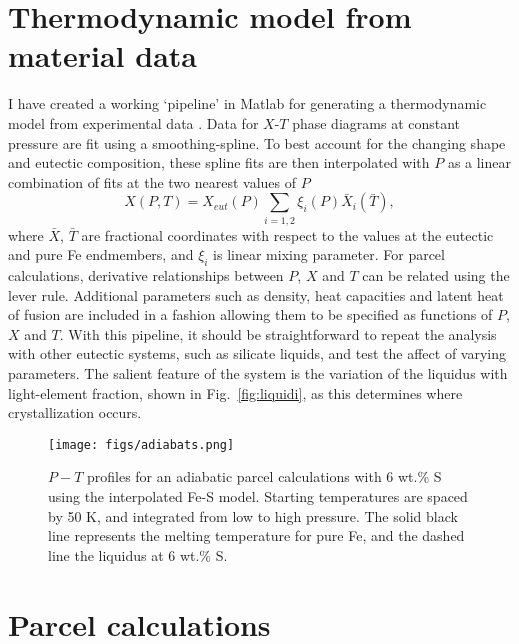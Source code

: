 \section{Thermodynamic model from material data}

I have created a working `pipeline' in Matlab for generating a thermodynamic model
from experimental data \citep{Brett1969,Fei1997,Chen2008,Stewart2007}. Data for
$X$-$T$ phase diagrams at constant pressure are fit using a smoothing-spline. To best
account for the changing shape and eutectic composition, these spline fits are then
interpolated with $P$ as a linear combination of fits at the two nearest values of
$P$
%
\begin{equation}
  X(P,T) = X_{eut}(P)\sum_{i=1,2}\xi_i(P)\bar{X}_i(\bar{T}),
\end{equation}
%
where $\bar{X}$, $\bar{T}$ are fractional coordinates with respect to the
values at the eutectic and pure Fe endmembers, and $\xi_i$
is linear mixing parameter. For parcel
calculations, derivative relationships between $P$, $X$ and $T$ can be related
using the lever rule. Additional parameters such as density, heat capacities
and latent heat of fusion are included in a fashion allowing them to be
specified as functions of $P$, $X$ and $T$. With this pipeline, it should be
straightforward to repeat the analysis with other eutectic systems, such as
silicate liquids, and test the affect of varying parameters.
The salient feature of the system is the variation of the
liquidus with light-element fraction, shown in Fig.~\ref{fig:liquidi}, as this
determines where crystallization occurs.

 \begin{figure}[h] %
   \centering
   \texttt{[image: figs/adiabats.png]} 
   \caption{$P-T$ profiles for an adiabatic parcel calculations with 6 wt.\% S using the interpolated Fe-S model. Starting 
   temperatures are spaced by 50 K, and integrated from low to high pressure. The solid black line represents 
   the melting temperature for pure Fe, and the dashed line the liquidus at 6 wt.\% S.}
   \label{fig:adiabats}
\end{figure}


\section{Parcel calculations}

